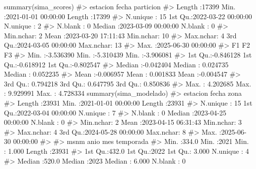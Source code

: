 \documentclass[
  spanish,
  letterpaper,
  DIV=11,
  numbers=noendperiod]{scrartcl}
\newenvironment{Shaded}{\begin{snugshade}}{\end{snugshade}}
\newcommand{\CommentTok}[1]{\textcolor[rgb]{0.37,0.37,0.37}{#1}}
\newcommand{\FunctionTok}[1]{\textcolor[rgb]{0.28,0.35,0.67}{#1}}
\newcommand{\NormalTok}[1]{\textcolor[rgb]{0.00,0.23,0.31}{#1}}
\begin{document}
\begin{Shaded}
\begin{Highlighting}[]
\FunctionTok{summary}\NormalTok{(sima\_scores)}
\CommentTok{\#\textgreater{}       estacion         fecha                         particion    }
\CommentTok{\#\textgreater{}  Length   :17399   Min.   :2021{-}01{-}01 00:00:00   Length   :17399  }
\CommentTok{\#\textgreater{}  N.unique :   15   1st Qu.:2022{-}03{-}22 00:00:00   N.unique :    2  }
\CommentTok{\#\textgreater{}  N.blank  :    0   Median :2023{-}03{-}09 00:00:00   N.blank  :    0  }
\CommentTok{\#\textgreater{}  Min.nchar:    2   Mean   :2023{-}03{-}20 17:11:43   Min.nchar:   10  }
\CommentTok{\#\textgreater{}  Max.nchar:    4   3rd Qu.:2024{-}03{-}05 00:00:00   Max.nchar:   13  }
\CommentTok{\#\textgreater{}                    Max.   :2025{-}06{-}30 00:00:00                    }
\CommentTok{\#\textgreater{}        F1                  F2                  F3           }
\CommentTok{\#\textgreater{}  Min.   :{-}3.536390   Min.   :{-}5.310439   Min.   :{-}3.906081  }
\CommentTok{\#\textgreater{}  1st Qu.:{-}0.846128   1st Qu.:{-}0.618912   1st Qu.:{-}0.802547  }
\CommentTok{\#\textgreater{}  Median :{-}0.042404   Median : 0.024735   Median : 0.052235  }
\CommentTok{\#\textgreater{}  Mean   :{-}0.006957   Mean   : 0.001833   Mean   :{-}0.004547  }
\CommentTok{\#\textgreater{}  3rd Qu.: 0.794218   3rd Qu.: 0.647795   3rd Qu.: 0.850836  }
\CommentTok{\#\textgreater{}  Max.   : 4.202685   Max.   : 9.929991   Max.   : 4.728334}
\FunctionTok{summary}\NormalTok{(sima\_modelado)}
\CommentTok{\#\textgreater{}       estacion         fecha                            zona      }
\CommentTok{\#\textgreater{}  Length   :23931   Min.   :2021{-}01{-}01 00:00:00   Length   :23931  }
\CommentTok{\#\textgreater{}  N.unique :   15   1st Qu.:2022{-}03{-}04 00:00:00   N.unique :    7  }
\CommentTok{\#\textgreater{}  N.blank  :    0   Median :2023{-}04{-}25 00:00:00   N.blank  :    0  }
\CommentTok{\#\textgreater{}  Min.nchar:    2   Mean   :2023{-}04{-}15 06:31:43   Min.nchar:    3  }
\CommentTok{\#\textgreater{}  Max.nchar:    4   3rd Qu.:2024{-}05{-}28 00:00:00   Max.nchar:    8  }
\CommentTok{\#\textgreater{}                    Max.   :2025{-}06{-}30 00:00:00                    }
\CommentTok{\#\textgreater{}                                                                   }
\CommentTok{\#\textgreater{}       msnm            anio           mes             temporada    }
\CommentTok{\#\textgreater{}  Min.   :334.0   Min.   :2021   Min.   : 1.000   Length   :23931  }
\CommentTok{\#\textgreater{}  1st Qu.:432.0   1st Qu.:2022   1st Qu.: 3.000   N.unique :    4  }
\CommentTok{\#\textgreater{}  Median :520.0   Median :2023   Median : 6.000   N.blank  :    0  }

\end{Highlighting}
\end{Shaded}
\end{document}
